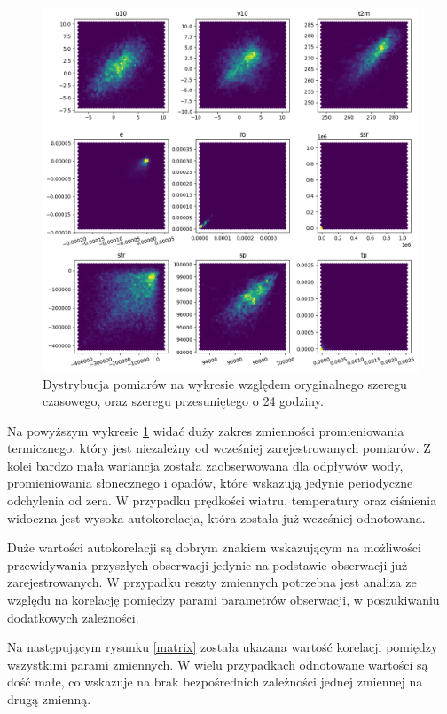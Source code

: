 \begin{figure}[H]
    \centering
    \includegraphics[width=\textwidth]{images/autocorrelation_hex.png}
    \caption{Dystrybucja pomiarów na wykresie względem oryginalnego szeregu czasowego,
    oraz szeregu przesuniętego o 24 godziny.}
    \label{hex}
\end{figure}

Na powyższym wykresie \ref{hex} widać duży zakres zmienności promieniowania termicznego,
który jest niezależny od wcześniej zarejestrowanych pomiarów. Z kolei bardzo mała wariancja 
została zaobserwowana dla odpływów wody, promieniowania słonecznego i opadów, które wskazują 
jedynie periodyczne odchylenia od zera. W przypadku prędkości wiatru, temperatury oraz 
ciśnienia widoczna jest wysoka autokorelacja, która została już wcześniej odnotowana. 

Duże wartości autokorelacji są dobrym znakiem wskazującym na możliwości przewidywania przyszłych
obserwacji jedynie na podstawie obserwacji już zarejestrowanych. W przypadku reszty zmiennych
potrzebna jest analiza ze względu na korelację pomiędzy parami parametrów obserwacji, w 
poszukiwaniu dodatkowych zależności.

Na następującym rysunku \ref{matrix} została ukazana wartość korelacji pomiędzy wszystkimi 
parami zmiennych. W wielu przypadkach odnotowane wartości są dość małe, co wskazuje na brak
bezpośrednich zależności jednej zmiennej na drugą zmienną. 

